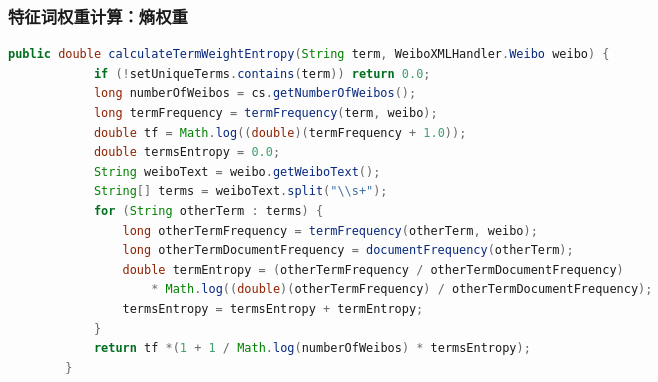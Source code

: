 \documentclass[CJKutf8, table]{beamer}
\begin{document}
\begin{CJK}{UTF8}{gbsn}
\begin{frame}[fragile]
  \frametitle{特征词权重计算：熵权重}
  \lstset{language=Java,basicstyle=\ttfamily,commentstyle=\ttfamily}
  \begin{tiny}
    \begin{block}{}
      \begin{lstlisting}[language=Java]
        public double calculateTermWeightEntropy(String term, WeiboXMLHandler.Weibo weibo) {
            if (!setUniqueTerms.contains(term)) return 0.0;
            long numberOfWeibos = cs.getNumberOfWeibos();
            long termFrequency = termFrequency(term, weibo);
            double tf = Math.log((double)(termFrequency + 1.0));
            double termsEntropy = 0.0;
            String weiboText = weibo.getWeiboText();
            String[] terms = weiboText.split("\\s+");
            for (String otherTerm : terms) {
                long otherTermFrequency = termFrequency(otherTerm, weibo);
                long otherTermDocumentFrequency = documentFrequency(otherTerm);
                double termEntropy = (otherTermFrequency / otherTermDocumentFrequency) 
                    * Math.log((double)(otherTermFrequency) / otherTermDocumentFrequency);
                termsEntropy = termsEntropy + termEntropy;
            }
            return tf *(1 + 1 / Math.log(numberOfWeibos) * termsEntropy);
        }
       	\end{lstlisting}
    \end{block}
  \end{tiny}
\end{frame}


\end{CJK}
\end{document}

